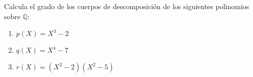 \documentclass[a4paper, 11pt]{article}
\begin{document}
  \maketitle

  \begin{ejercicio}
      Calcula el grado de los cuerpos de descomposición de los siguientes polinomios sobre $\mathbb{Q}$:
      \begin{enumerate}
          \item $p(X) = X^3-2$
          \item $q(X) = X^4-7$
          \item $r(X) = (X^2-2)(X^2-5)$
      \end{enumerate}
  \end{ejercicio}

  \begin{apartado}
  \end{apartado}
\end{document}
